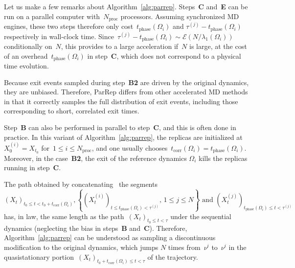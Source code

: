 \documentclass[a4]{article}
\newcommand{\1}{\mathbbm 1}
\newcommand{\corr}{\mathrm{corr}}
\newcommand{\phase}{\mathrm{phase}}
\begin{document}
    Let us make a few remarks about Algorithm~\ref{alg:parrep}. Steps~{\bf{C}} and~{\bf{E}} can be run on a parallel computer with~$N_{\mathrm{proc}}$ processors. Assuming synchronized MD engines, these two steps therefore only cost~$t_{\phase}(\Omega_i)$ and $\tau^{(j)}-t_{\phase}(\Omega_i)$ respectively in wall-clock time. Since~$\tau^{(j)}-t_{\phase}(\Omega_i)\sim\mathcal E(N/\lambda_1(\Omega_i))$ conditionally on~$N$, this provides to a large acceleration if~$N$ is large, at the cost of an overhead~$t_{\phase}(\Omega_i)$ in step~{\bf{C}}, which does not correspond to a physical time evolution. 

    Because exit events sampled during step~{\bf{B2}} are driven by the original dynamics, they are unbiased. Therefore, ParRep differs from other accelerated MD methods in that it correctly samples the full distribution of exit events, including those corresponding to short, correlated exit times.
    
    Step~{\bf{B}} can also be performed in parallel to step~{\bf{C}}, and this is often done in practice. In this variant of Algorithm~\ref{alg:parrep}, the replicas are initialized at~$X_0^{(i)}=X_{t_0}$ for~$1\leq i\leq N_{\mathrm{proc}}$, and one usually chooses~$t_{\corr}(\Omega_i)=t_{\phase}(\Omega_i)$. Moreover, in the case~{\bf{B2}}, the exit of the reference dynamics $\Omega_i$ kills the replicas running in step~{\bf{C}}.
    
    The path obtained by concatenating~ the segments
    $$(X_t)_{t_0\leq t< t_0+t_{\corr}(\Omega_i)},\left\{(X_t^{(i)})_{t\leq t_{\phase}(\Omega_i)<\tau^{(j)}},\,1\leq j \leq N\right\}\text{ and }(X_t^{(j)})_{t_{\phase}(\Omega_i)\leq t<\tau^{(j)}}$$
    has, in law, the same length as the path~$(X_t)_{t_0\leq t < \tau}$ under the sequential dynamics (neglecting the bias in steps~{\bf{B}} and~{\bf{C}}). Therefore, Algorithm~\ref{alg:parrep} can be understood as sampling a discontinuous modification to the original dynamics, which jumps $N$ times from~$\nu^i$ to~$\nu^i$ in the quasistationary portion~$(X_t)_{t_0+t_{\corr}(\Omega_i)\leq t < \tau}$ of the trajectory.
    
\end{document}
